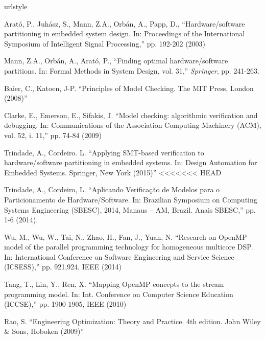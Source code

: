 \begin{thebibliography}{5}
\providecommand{\natexlab}[1]{#1}
\providecommand{\url}[1]{{#1}}
\providecommand{\urlprefix}{URL }
\expandafter\ifx\csname urlstyle\endcsname\relax
  \providecommand{\doi}[1]{DOI~\discretionary{}{}{}#1}\else
  \providecommand{\doi}{DOI~\discretionary{}{}{}\begingroup
  \urlstyle{rm}\Url}\fi
\providecommand{\eprint}[2][]{\url{#2}}

Arat\'o, P., Juh\'asz, S., Mann, Z.A., Orb\'an, A., Papp, D., ``{Hardware/software partitioning in embedded system design. In: Proceedings of the International Symposium of Intelligent Signal Processing},'' pp. 192-202 (2003)

Mann, Z.A., Orb\'an, A., Arat\'o, P., ``{Finding optimal hardware/software partitions. In: Formal Methods in System Design, vol. 31},'' {\em Springer}, pp. 241-263.

Baier, C., Katoen, J-P. ``{Principles of Model Checking. The MIT Press, London (2008)}''

Clarke, E., Emerson, E., Sifakis, J. ``{Model checking: algorithmic verification and debugging. In: Communications of the Association Computing Machinery (ACM), vol. 52, i. 11},'' pp. 74-84 (2009)

Trindade, A., Cordeiro. L. ``{Applying SMT-based verification to hardware/software partitioning in embedded systems. In: Design Automation for Embedded Systems. Springer, New York (2015)}''
<<<<<<< HEAD

Trindade, A., Cordeiro, L. ``{Aplicando Verificação de Modelos para o Particionamento de Hardware/Software. In: Brazilian Symposium on Computing Systems Engineering (SBESC), 2014, Manaus – AM, Brazil. Anais SBESC},'' pp. 1-6 (2014).

Wu, M., Wu, W., Tai, N., Zhao, H., Fan, J., Yuan, N. ``{Research on OpenMP model of the parallel programming technology for homogeneous multicore DSP. In: International Conference on Software Engineering and Service Science (ICSESS)},'' pp. 921,924, IEEE (2014)

Tang, T., Lin, Y., Ren, X. ``{Mapping OpenMP concepts to the stream programming model. In: Int. Conference on Computer Science Education (ICCSE)},'' pp. 1900-1905, IEEE (2010)

Rao, S. ``{Engineering Optimization: Theory and Practice. 4th edition. John Wiley \& Sons, Hoboken (2009)}''


\end{thebibliography}
